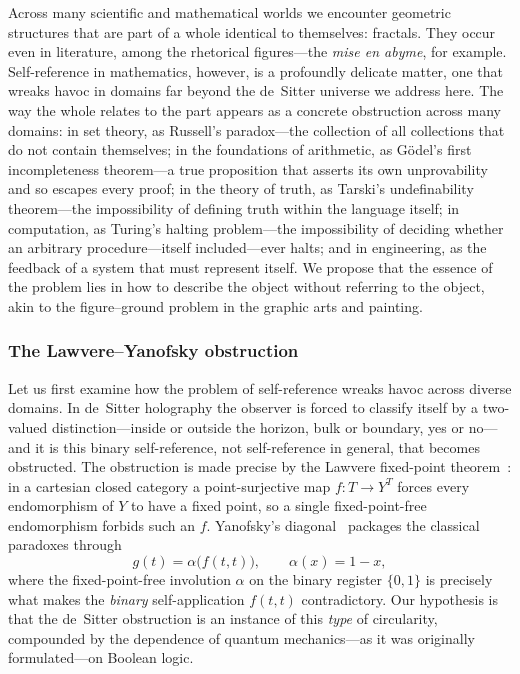 Across many scientific and mathematical worlds we encounter geometric structures that are part of a whole identical to themselves: fractals. They occur even in literature, among the rhetorical figures---the \emph{mise en abyme}, for example. Self-reference in mathematics, however, is a profoundly delicate matter, one that wreaks havoc in domains far beyond the de~Sitter universe we address here. The way the whole relates to the part appears as a concrete obstruction across many domains: in set theory, as Russell's paradox---the collection of all collections that do not contain themselves; in the foundations of arithmetic, as G\"odel's first incompleteness theorem---a true proposition that asserts its own unprovability and so escapes every proof; in the theory of truth, as Tarski's undefinability theorem---the impossibility of defining truth within the language itself; in computation, as Turing's halting problem---the impossibility of deciding whether an arbitrary procedure---itself included---ever halts; and in engineering, as the feedback of a system that must represent itself. We propose that the essence of the problem lies in how to describe the object without referring to the object, akin to the figure--ground problem in the graphic arts and painting.

\subsubsection{The Lawvere--Yanofsky obstruction}
Let us first examine how the problem of self-reference wreaks havoc across diverse domains. In de~Sitter holography the observer is forced to classify itself
by a two-valued distinction---inside or outside the horizon, bulk or boundary, yes or no---and it is this binary
self-reference, not self-reference in general, that becomes obstructed. The obstruction is made precise by the
Lawvere fixed-point theorem~\cite{lawvere69}: in a cartesian closed category a point-surjective map
$f\colon T\to Y^{T}$ forces every endomorphism of $Y$ to have a fixed point, so a single fixed-point-free
endomorphism forbids such an $f$. Yanofsky's diagonal~\cite{yanofsky03} packages the classical paradoxes through
\begin{equation}\label{eq:LY}
g(t)=\alpha\bigl(f(t,t)\bigr),\qquad \alpha(x)=1-x,
\end{equation}
where the fixed-point-free involution $\alpha$ on the binary register $\{0,1\}$ is precisely what makes the
\emph{binary} self-application $f(t,t)$ contradictory. Our hypothesis is that the de~Sitter obstruction is an
instance of this \emph{type} of circularity, compounded by the dependence of quantum mechanics---as it was originally
formulated---on Boolean logic.


